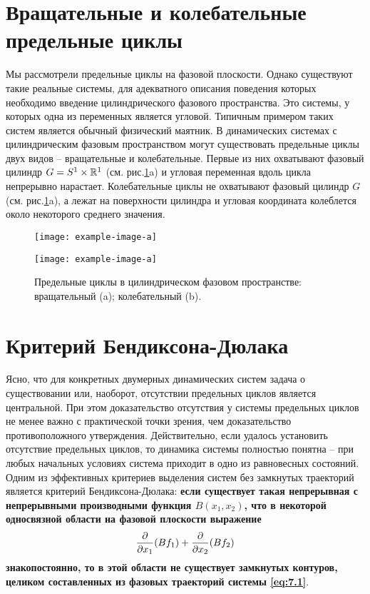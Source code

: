 \section{Вращательные и колебательные предельные циклы}%
\label{sec:7.3}

Мы рассмотрели предельные циклы на фазовой плоскости. Однако
существуют такие реальные системы, для адекватного описания поведения
которых необходимо введение цилиндрического фазового пространства. Это
системы, у которых одна из переменных является угловой. Типичным
примером таких систем является обычный физический маятник. В
динамических системах с цилиндрическим фазовым пространством могут
существовать предельные циклы двух видов – вращательные и колебательные.
Первые из них охватывают фазовый цилиндр
$G = S^1 \times \mathbb{R}^1$ (см. рис.\ref{fig:7.5}a)
 и угловая
переменная вдоль цикла непрерывно нарастает. Колебательные циклы не
охватывают фазовый цилиндр $G$ (см. рис.\ref{fig:7.5}a), а лежат на поверхности цилиндра и
угловая координата колеблется около некоторого среднего значения.
\begin{figure}[h]
        \begin{minipage}{0.49\linewidth}
            \centering
            \texttt{[image: example-image-a]}
        \end{minipage}
        \begin{minipage}{0.49\linewidth}
            \centering
            \texttt{[image: example-image-a]}
        \end{minipage}
        \caption{Предельные циклы в цилиндрическом фазовом пространстве:
        вращательный (a);
        колебательный (b).}
        \label{fig:7.5}
\end{figure}


\section{Критерий Бендиксона-Дюлака}%
\label{sec:7.4}

Ясно, что для конкретных двумерных динамических систем задача о
существовании или, наоборот, отсутствии предельных циклов является
центральной. При этом доказательство отсутствия у системы предельных
циклов не менее важно с практической точки зрения, чем доказательство
противоположного утверждения. Действительно, если удалось установить
отсутствие предельных циклов, то динамика системы полностью понятна – при
любых начальных условиях система приходит в одно из равновесных
состояний. Одним из эффективных критериев выделения систем без замкнутых
траекторий является критерий Бендиксона-Дюлака: \textbf{если существует такая
        непрерывная с непрерывными производными функция $B(x_1,x_2)$, что в
некоторой односвязной области на фазовой плоскости выражение}
\begin{equation}
        \label{eq:}
        \pdv{x_1} (Bf_1) + \pdv{x_2} (B f_2)
\end{equation}
\textbf{знакопостоянно, то в этой области не существует замкнутых контуров,
целиком составленных из фазовых траекторий системы \eqref{eq:7.1}}.

